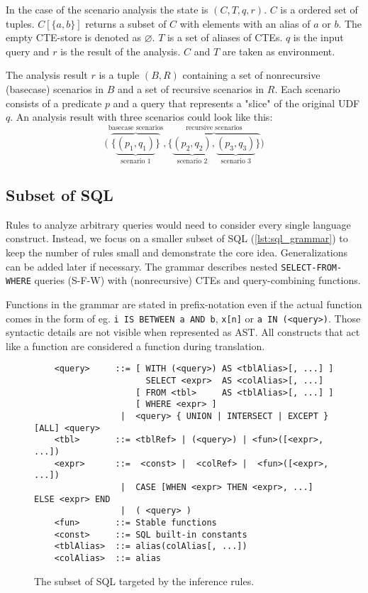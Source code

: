 In the case of the scenario analysis the state is $(C, T, q, r)$. $C$ is a ordered set of tuples. $C[\{a, b\}]$ returns a subset of $C$ with elements with an alias of $a$ or $b$. The empty CTE-store is denoted as $\varnothing$. $T$ is a set of aliases of CTEs. $q$ is the input query and $r$ is the result of the analysis. $C$ and $T$ are taken as environment.

The analysis result $r$ is a tuple $(B, R)$ containing a set of nonrecursive (basecase) scenarios in $B$ and a set of recursive scenarios in $R$. Each scenario consists of a predicate $p$ and a query that represents a "slice" of the original UDF $q$. An analysis result with three scenarios could look like this:
$$
\Big(
    \overbrace{\big\{
        \underbrace{
            (p_1, q_1)
        }_{\text{scenario 1}}
    \big\}}^{\text{basecase scenarios}}
    ,
    \overbrace{\big\{
        \underbrace{
            (p_2, q_2)
        }_{\text{scenario 2}},
        \underbrace{
            (p_3, q_3)
        }_{\text{scenario 3}}
    \big\}}^{\text{recursive scenarios}}
\Big)
$$

\subsection{Subset of SQL}
Rules to analyze arbitrary queries would need to consider every single language construct. Instead, we focus on a smaller subset of SQL (\autoref{lst:sql_grammar}) to keep the number of rules small and demonstrate the core idea. Generalizations can be added later if necessary. The grammar describes nested \texttt{SELECT-FROM-WHERE} queries (S-F-W) with (nonrecursive) CTEs and query-combining functions.

Functions in the grammar are stated in prefix-notation even if the actual function comes in the form of eg. \texttt{i IS BETWEEN a AND b}, \texttt{x[n]} or \texttt{a IN (<query>)}. Those syntactic details are not visible when represented as AST. All constructs that act like a function are considered a function during translation.

\begin{figure}[h!]
    \begin{verbatim}
    <query>     ::= [ WITH (<query>) AS <tblAlias>[, ...] ]
                      SELECT <expr>  AS <colAlias>[, ...]
                    [ FROM <tbl>     AS <tblAlias>[, ...] ]
                    [ WHERE <expr> ]
                 |  <query> { UNION | INTERSECT | EXCEPT } [ALL] <query>
    <tbl>       ::= <tblRef> | (<query>) | <fun>([<expr>, ...])
    <expr>      ::=  <const> |  <colRef> |  <fun>([<expr>, ...])
                 |  CASE [WHEN <expr> THEN <expr>, ...] ELSE <expr> END
                 |  ( <query> )
    <fun>       ::= Stable functions
    <const>     ::= SQL built-in constants
    <tblAlias>  ::= alias(colAlias[, ...])
    <colAlias>  ::= alias
    \end{verbatim}
    \caption{The subset of SQL targeted by the inference rules.}
    \label{lst:sql_grammar}
\end{figure}


